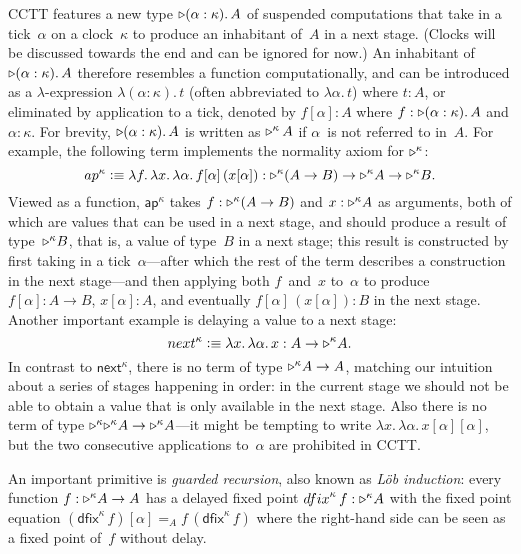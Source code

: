 \documentclass[a4paper,UKenglish,numberwithinsect,cleveref,thm-restate]{lipics-v2021}
\numberwithin{equation}{section}
\theoremstyle{definition}
\theoremstyle{plain}
\begin{document}
CCTT features a new type $\mathord{\triangleright} (\alpha : \kappa).\, A$ of suspended computations that take in a tick~$\alpha$ on a clock~$\kappa$ to produce an inhabitant of~$A$ in a next stage.
(Clocks will be discussed towards the end and can be ignored for now.)
An inhabitant of $\mathord{\triangleright} (\alpha : \kappa).\, A$ therefore resembles a function computationally, and can be introduced as a $\lambda$-expression $\lambda(\alpha : \kappa).\,t$ (often abbreviated to $\lambda\alpha.\,t$) where $t : A$, or eliminated by application to a tick, denoted by $f[\alpha] : A$ where $f : \mathord{\triangleright} (\alpha : \kappa).\, A$ and $\alpha : \kappa$.
For brevity, $\mathord{\triangleright} (\alpha : \kappa).\,A$ is written as $\mathord{\triangleright}^\kappa\, A$ if $\alpha$~is not referred to in~$A$.
For example, the following term implements the normality axiom for $\mathord{\triangleright}^\kappa$:
\[
  \mathsf{ap}^\kappa \defeq \lambda f.\,\lambda x.\,\lambda \alpha.\, f[\alpha]\,(x[\alpha]) : \laterp^\kappa(A \to B) \to \laterp^\kappa A \to \laterp^\kappa B.
\]
Viewed as a function, $\mathsf{ap}^\kappa$ takes $f : \mathord{\triangleright}^\kappa(A \to B)$ and $x : \mathord{\triangleright}^\kappa A$ as arguments, both of which are values that can be used in a next stage, and should produce a result of type~$\mathord{\triangleright}^\kappa B$, that is, a value of type~$B$ in a next stage; this result is constructed by first taking in a tick~$\alpha$---after which the rest of the term describes a construction in the next stage---and then applying both $f$~and~$x$ to~$\alpha$ to produce $f[\alpha] : A \to B$, $x[\alpha] : A$, and eventually $f[\alpha]\,(x[\alpha]) : B$ in the next stage.
Another important example is delaying a value to a next stage:
\[
  \mathsf{next}^\kappa \defeq \lambda x.\,\lambda \alpha.\, x : A \to \laterp^\kappa A.
\]
In contrast to $\mathsf{next}^\kappa$, there is no term of type $\mathord{\triangleright}^\kappa A \to A$, matching our intuition about a series of stages happening in order: in the current stage we should not be able to obtain a value that is only available in the next stage.
Also there is no term of type $\mathord{\triangleright}^\kappa \mathord{\triangleright}^\kappa A \to \mathord{\triangleright}^\kappa A$---it might be tempting to write $\lambda x.\, \lambda\alpha.\, x[\alpha][\alpha]$, but the two consecutive applications to~$\alpha$ are prohibited in CCTT.

An important primitive is \emph{guarded recursion}, also known as \emph{Löb induction}: every function $f : \mathord{\triangleright}^\kappa A \to A$ has a delayed fixed point $\mathsf{dfix}^\kappa\,f : \laterp^\kappa A$ with the fixed point equation $(\mathsf{dfix}^\kappa\,f)[\alpha] =_A f\,(\mathsf{dfix}^\kappa\,f)$ where the right-hand side can be seen as a fixed point of~$f$ without delay.
\end{document}
